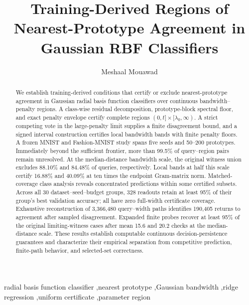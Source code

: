 \documentclass[preprint,12pt,authoryear]{elsarticle}
\begin{document}
\begin{frontmatter}
\title{Training-Derived Regions of Nearest-Prototype Agreement in Gaussian RBF Classifiers}
\author[msu]{Meshaal Mouawad}
\begin{abstract}
We establish training-derived conditions that certify or exclude nearest-prototype agreement in Gaussian radial basis function classifiers over continuous bandwidth--penalty regions. A class-wise residual decomposition, prototype-block spectral floor, and exact penalty envelope certify complete regions $(0,t]\times[\lambda_0,\infty)$. A strict competing vote in the large-penalty limit supplies a finite disagreement bound, and a signed interval construction certifies local bandwidth bands with finite penalty floors. A frozen MNIST and Fashion-MNIST study spans five seeds and 50--200 prototypes. Immediately beyond the sufficient frontier, more than 99.5\% of query--region pairs remain unresolved. At the median-distance bandwidth scale, the original witness union excludes 88.10\% and 84.48\% of queries, respectively. Local bands at half this scale certify 16.88\% and 40.09\% at ten times the endpoint Gram-matrix norm. Matched-coverage class analysis reveals concentrated predictions within some certified subsets. Across all 30 dataset--seed--budget groups, 328 readouts retain at least 95\% of their group's best validation accuracy; all have zero full-width certificate coverage. Exhaustive reconstruction of 3,366,480 query--width paths identifies 190,405 returns to agreement after sampled disagreement. Expanded finite probes recover at least 95\% of the original limiting-witness cases after mean 15.6 and 20.2 checks at the median-distance scale. These results establish computable continuous decision-persistence guarantees and characterize their empirical separation from competitive prediction, finite-path behavior, and selected-set correctness.
\end{abstract}
\begin{keyword}
radial basis function classifier \sep nearest prototype \sep Gaussian bandwidth \sep ridge regression \sep uniform certificate \sep parameter region
\end{keyword}
\end{frontmatter}
\end{document}
